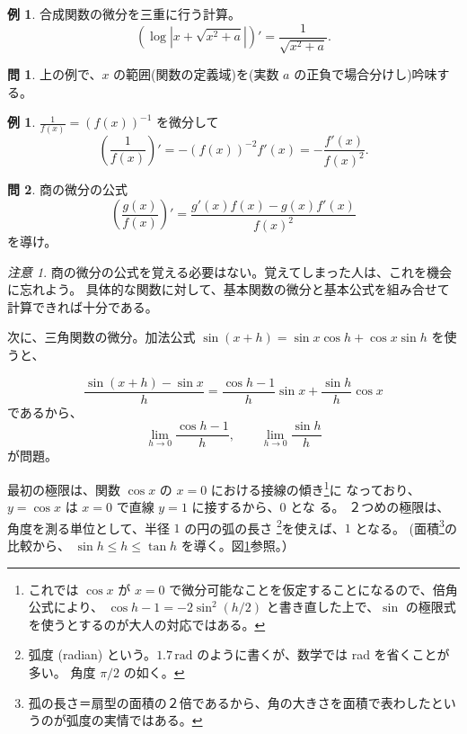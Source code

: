 \documentclass[a4paper]{jsarticle}
\theoremstyle{definition}
\newtheorem{Example}[Theorem]{例}
\newtheorem{Exercise}{問}%
\theoremstyle{remark}
\newtheorem{Remark}{注意}
\begin{document}
\begin{Example}
合成関数の微分を三重に行う計算。
\[
\left(
\log \left|x + \sqrt{x^2+a}\right|
\right)'
= \frac{1}{\sqrt{x^2+a}}.
\]
\end{Example}

\begin{Exercise}
上の例で、$x$ の範囲(関数の定義域)を(実数 $a$ の正負で場合分けし)吟味する。
\end{Exercise}

\begin{Example} 
$\displaystyle \frac{1}{f(x)} = (f(x))^{-1}$ を微分して
\[
\left(\frac{1}{f(x)}\right)' = -(f(x))^{-2} f'(x) =  - \frac{f'(x)}{f(x)^2}.
\]  
\end{Example}
\begin{Exercise}
商の微分の公式
\[
\left(
\frac{g(x)}{f(x)}
\right)' 
= \frac{g'(x)f(x) - g(x) f'(x)}{f(x)^2}
\]
を導け。
\end{Exercise}

\begin{Remark}
{\small
商の微分の公式を覚える必要はない。覚えてしまった人は、これを機会に忘れよう。
具体的な関数に対して、基本関数の微分と基本公式を組み合せて計算できれば十分である。}
\end{Remark}

次に、三角関数の微分。加法公式 $\sin(x+h) = \sin x\cos h + \cos x \sin h$ を使うと、

\[
\frac{\sin(x+h) - \sin x}{h} = \frac{\cos h -1}{h} \sin x +
\frac{\sin h}{h} \cos x
\]
であるから、
\[
\lim_{h\to 0} \frac{\cos h -1}{h},\qquad
\lim_{h\to 0} \frac{\sin h}{h}
\]
が問題。

最初の極限は、関数 $\cos x$ の $x=0$ における接線の傾き\footnote{これでは $\cos x$ が $x=0$ で微分可能なことを仮定することになるので、倍角公式により、
$\cos h - 1 = -2 \sin^2(h/2)$ と書き直した上で、$\sin$ の極限式を使うとするのが大人の対応ではある。}に
なっており、$y = \cos x$ は $x=0$ で直線 $y = 1$ に接するから、$0$ とな
る。
２つめの極限は、角度を測る単位として、半径 $1$ の円の弧の長さ
\footnote{弧度 (radian) という。$1.7\, \text{rad}$ のように書くが、数学では rad を省くことが多い。
角度 $\pi/2$ の如く。
}を使えば、$1$ となる。
(面積\footnote{孤の長さ＝扇型の面積の２倍であるから、角の大きさを面積で表わしたというのが弧度の実情ではある。}の比較から、
$\sin h \leq h \leq \tan h$ を導く。図\ref{sin}参照。）

\begin{figure}
\begin{center}

\end{center}
\caption{}
\label{sin}
\end{figure}
\end{document}
